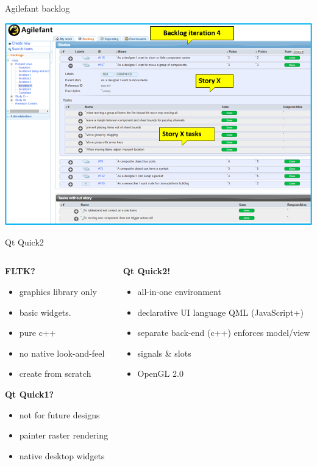\documentclass[11pt]{beamer}
\begin{document}
\begin{frame}{Agilefant backlog}
	\begin{center}
		\includegraphics[width=0.9\linewidth]{pictures/backlog}
	\end{center}
\end{frame}

\begin{frame}{Qt Quick2}
	\begin{columns}
		\begin{column}[t]{5cm}
			{\bf FLTK?}
			\begin{itemize}
				\item graphics library only
				\item basic widgets.
				\item pure c++
				\item no native look-and-feel
				\item create from scratch
			\end{itemize}
			\pause
			{\bf Qt Quick1?}
			\begin{itemize}
				\item not for future designs
				\item painter raster rendering
				\item native desktop widgets
			\end{itemize}
		\end{column}
		\pause
		\begin{column}[t]{5cm}
			\textbf{Qt Quick2!}
			\begin{itemize}
				\item all-in-one environment
				\item declarative UI language QML (JavaScript+)
				\item separate back-end (c++) enforces model/view
				\item signals \& slots
				\item OpenGL 2.0
			\end{itemize}
		\end{column}
	\end{columns}
\end{frame}
\end{document}
